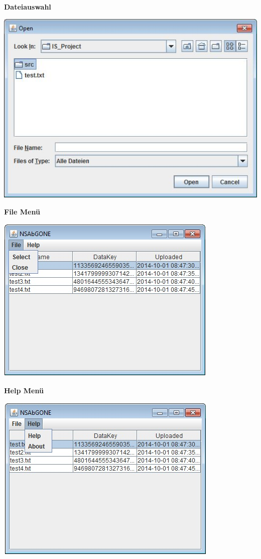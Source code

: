 \documentclass[12pt,a4paper,bibliography=totocnumbered,listof=totocnumbered]{scrartcl}
\begin{document}
\textbf{Dateiauswahl}
\vspace{1em}
$\;$\\
\begin{minipage}{\linewidth}
	\centering
	\includegraphics[width=0.7\linewidth]{Select.jpg}
	\label{Dateiauswahl}
\end{minipage}
\vspace{1em}

\textbf{File Menü}
\vspace{1em}
$\;$\\
\begin{minipage}{\linewidth}
	\centering
	\includegraphics[width=0.7\linewidth]{File.jpg}
	\label{File}
\end{minipage}
\vspace{1em}

\textbf{Help Menü}
\vspace{1em}
$\;$\\
\begin{minipage}{\linewidth}
	\centering
	\includegraphics[width=0.7\linewidth]{Help.jpg}
	\label{Help}
\end{minipage}
\vspace{1em}
\end{document}
